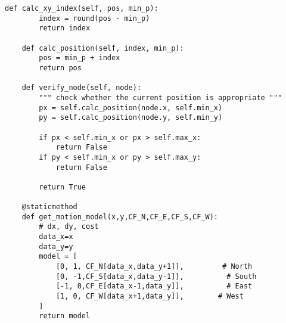\begin{lstlisting}[caption=Function for finding the efficient path under a given speed (\autoref{Pathfinding}), label=moddijk]
    def calc_xy_index(self, pos, min_p):
        index = round(pos - min_p)
        return index

    def calc_position(self, index, min_p):
        pos = min_p + index
        return pos

    def verify_node(self, node):
        """ check whether the current position is appropriate """
        px = self.calc_position(node.x, self.min_x)
        py = self.calc_position(node.y, self.min_y)

        if px < self.min_x or px > self.max_x:
            return False
        if py < self.min_x or py > self.max_y:
            return False

        return True

    @staticmethod
    def get_motion_model(x,y,CF_N,CF_E,CF_S,CF_W):
        # dx, dy, cost
        data_x=x
        data_y=y
        model = [
            [0, 1, CF_N[data_x,data_y+1]],         # North
            [0, -1,CF_S[data_x,data_y-1]],          # South
            [-1, 0,CF_E[data_x-1,data_y]],          # East
            [1, 0, CF_W[data_x+1,data_y]],        # West
        ]
        return model
\end{lstlisting}
